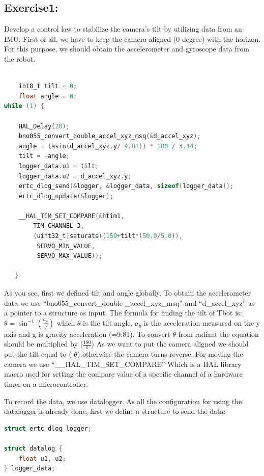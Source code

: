 \documentclass[english]{article}
\begin{document}
\subsection{Exercise1:}
Develop a control law to stabilize the camera’s tilt by utilizing data from an IMU. \newline
First of all, we have to keep the camera aligned (0 degree) with the horizon. For
this purpose, we should obtain the accelerometer and gyroscope data from the robot.
\begin{lstlisting}[language=C, caption={C code using listings}, label={lst:cameraTilt} ]

    int8_t tilt = 0; 
    float angle = 0; 
while (1) { 

    HAL_Delay(20); 
    bno055_convert_double_accel_xyz_msq(&d_accel_xyz); 
    angle = (asin(d_accel_xyz.y/ 9.81)) * 180 / 3.14; 
    tilt = -angle; 
    logger_data.u1 = tilt; 
    logger_data.u2 = d_accel_xyz.y; 
    ertc_dlog_send(&logger, &logger_data, sizeof(logger_data)); 
    ertc_dlog_update(&logger); 

    __HAL_TIM_SET_COMPARE(&htim1,
        TIM_CHANNEL_3,
        (uint32_t)saturate((150+tilt*(50.0/5.0)),
         SERVO_MIN_VALUE, 
         SERVO_MAX_VALUE));  

   } 
\end{lstlisting}
As you see, first we defined tilt and angle globally. 
To obtain the accelerometer data we use “bno055\_convert\_double
\_accel\_xyz\_msq”
and “d\_accel\_xyz” as a pointer to a structure as input.
\newpage
The formula for finding the tilt of Tbot is: 
\textbf{$\theta = \sin^{-1}\left(\frac{a_y}{g}\right)$} which $\theta$ is the tilt angle,
${a_y}$ is the acceleration measured on the y axis and g is gravity acceleration (=9.81).
To convert $\theta$ from radiant the equation should be multiplied by ($\frac{180}{\pi}$)
As we want to put the camera aligned we should put the tilt equal to (-$\theta$) 
otherwise the camera turns reverse. \newline
For moving the camera we use “\_\_HAL\_TIM\_SET\_COMPARE” Which is a HAL library macro
 used for setting the compare value of a specific channel of a hardware timer on a
  microcontroller. \newline

  To record the data, we use datalogger. As all the configuration for using the 
  datalogger is already done, first we define a structure to send the data:
\begin{lstlisting}[language=C, caption={}, label={lst:datalog} ]
struct ertc_dlog logger; 

struct datalog { 
    float u1, u2; 
} logger_data;  
\end{lstlisting} 
\end{document}
